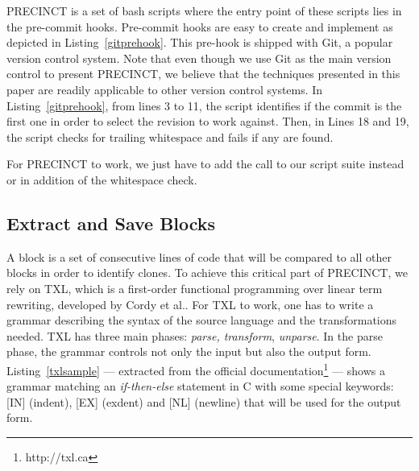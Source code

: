 \documentclass[conference]{IEEEtran}
\begin{document}
PRECINCT is a set of bash scripts where the entry point of these scripts lies in the pre-commit hooks. Pre-commit hooks are easy to create and implement as depicted in Listing~\ref{gitprehook}.
This pre-hook is shipped with Git, a popular version control system.
Note that even though we use Git as the main version control to present PRECINCT, we believe that the techniques presented in this paper are readily applicable to other version control systems.
In Listing~\ref{gitprehook}, from lines 3 to 11, the script identifies if the commit is the first one in order to select the revision to work against.
Then, in Lines 18 and 19, the script checks for trailing whitespace and fails if any are found.

For PRECINCT to work, we just have to add the call to our script suite instead or in addition of the whitespace check.

\noindent\begin{minipage}{0.90\linewidth}

  

\end{minipage}


\subsection{Extract and Save Blocks}
\label{sub:Extract and Save Blocks}

A block is a set of consecutive lines of code that will be compared to all other blocks in order to identify clones.
To achieve this critical part of PRECINCT, we rely on TXL\cite{Cordy2006a}, which is a first-order functional programming over linear term rewriting, developed by Cordy et al.\cite{Cordy2006a}.
For TXL to work, one has to write a grammar describing the syntax of the source  language and the transformations needed. TXL has three main phases: \textit{parse, transform}, \textit{unparse}.
In the parse phase, the grammar controls not only the input but also the output form.
Listing~\ref{txlsample} --- extracted from the official documentation\footnote{http://txl.ca} --- shows a grammar matching an \textit{if-then-else} statement in C with some special keywords: [IN] (indent), [EX] (exdent) and [NL] (newline) that will be used for the output form.

\noindent\begin{minipage}{0.90\linewidth}

  

\end{minipage}
\end{document}

